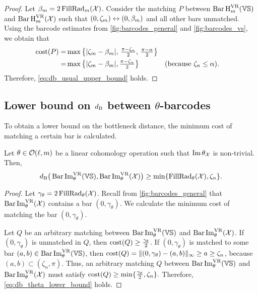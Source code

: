 \begin{proof}
    Let $\beta_m = 2\firstdeath{m}{\cX}$.
	Consider the matching $P$ between $\Hbarc[\field]{\degp}{\VS}$ and $\Hbarc[\field]{\degp}{\cX}$ such that $(0,\zeta_\degp ) \leftrightarrow (0, \beta_\degp )$ and all other bars unmatched.
	Using the barcode estimates from \cref{fig:barcodes_general} and \cref{fig:barcodes_vs}, we obtain that %
	\begin{align*}
		\cost(P)
		= & \max\big\{|\zeta_\degp  - \beta_\degp |,\, \tfrac{\pi - \zeta_n}{2},\, \tfrac{\pi - \alpha}{2}\big\} \\
		= & \max\big\{|\zeta_\degp  - \beta_\degp |, \tfrac{\pi - \zeta_n}{2}\big\} && \mbox{(because $\zeta_n \leq \alpha$)}.
	\end{align*}
	Therefore, \cref{eq:db_usual_upper_bound} holds.
\end{proof}



\subsection{Lower bound on $\db$ between $\theta$-barcodes}
\label{subsub:db_theta_lower_bound}

To obtain a lower bound on the bottleneck distance, the minimum cost of matching a certain bar is calculated.

\medskip\proposition
Let $\theta \in \cO(\ell, \degp)$ be a linear cohomology operation such that $\img \theta_\cX$ is non-trivial.
Then,
\begin{equation}\label{eq:db_theta_lower_bound}
	\db\big(\thetabarc{\VS}, \thetabarc{\cX}\big)
	\geq \min\{\firstdeath{\theta}{\cX}, \zeta_n\}. %
\end{equation}

\begin{proof}
    Let $\gamma_\theta = 2\firstdeath{\theta}{\cX}$.
	Recall from \cref{fig:barcodes_general} that $\thetabarc{\cX}$ contains a bar $(0,\gamma_\theta)$.
	We calculate the minimum cost of matching the bar $(0,\gamma_\theta)$.

	Let $Q$ be an arbitrary matching between $\thetabarc{\VS}$ and $\thetabarc{\cX}$.
	If $(0,\gamma_\theta )$ is unmatched in $Q$, then $\cost(Q) \geq \tfrac{\gamma_\theta }{2}$.
	If $(0,\gamma_\theta )$ is matched to some bar $(a,b) \in \thetabarc{\VS}$, then
	$\cost(Q) =  \|(0,\gamma_\theta ) - (a,b)\|_\infty \geq a \geq \zeta_n$, because $(a,b) \subset (\zeta_n, \pi)$.
	Thus, an arbitrary matching $Q$ between $\thetabarc{\VS}$ and $\thetabarc{\cX}$ must satisfy $\cost(Q) \geq \min\{\tfrac{\gamma_\theta }{2}, \zeta_n\}.$
	Therefore, \cref{eq:db_theta_lower_bound} holds.
\end{proof}

